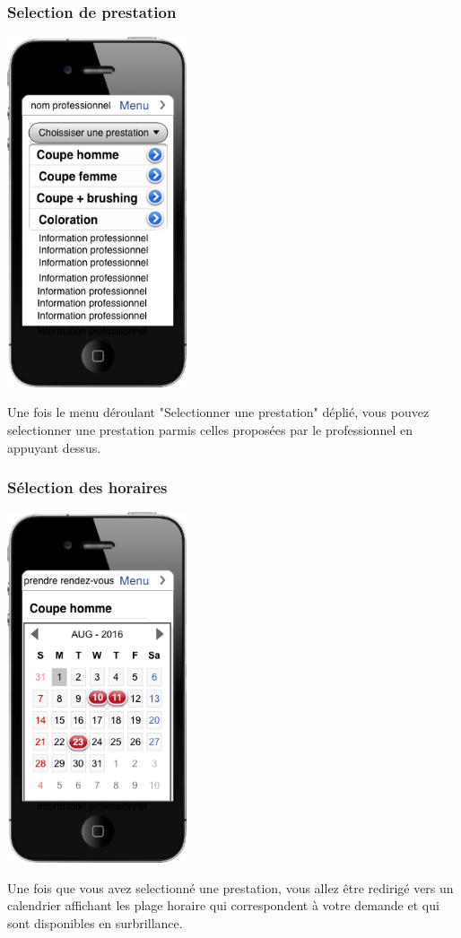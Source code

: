 \documentclass{article}
\begin{document}
\subsubsection{Selection de prestation}
\begin{center}
  \includegraphics[width=150pt]{Interfaces/prodeplie}
\end{center}
Une fois le menu déroulant "Selectionner une prestation" déplié, vous pouvez selectionner une prestation parmis celles proposées par le professionnel en appuyant dessus.

\subsubsection{Sélection des horaires}
\begin{center}
  \includegraphics[width=150pt]{Interfaces/calendrier}
\end{center}
Une fois que vous avez selectionné une prestation, vous allez être redirigé vers un calendrier affichant les plage horaire qui correspondent à votre demande et qui sont disponibles en surbrillance.
\end{document}
